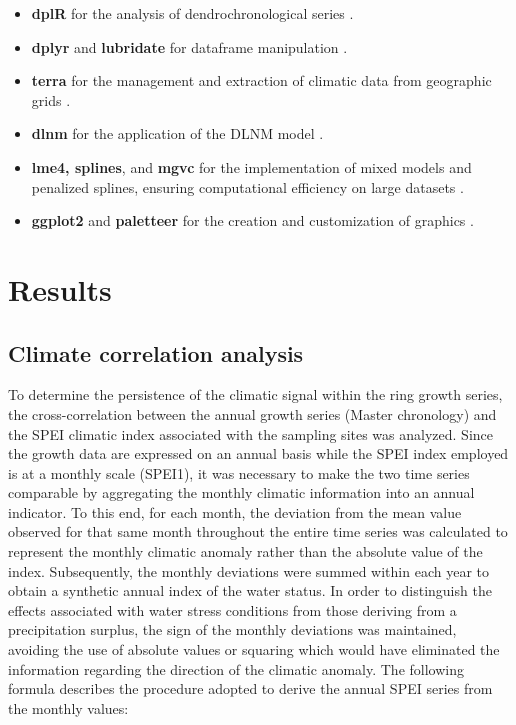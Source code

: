\documentclass[12pt, a4paper]{article}
\begin{document}
\begin{itemize}
    \item \textbf{dplR} for the analysis of dendrochronological series \parencite{bunn2025}.
    \item \textbf{dplyr} and \textbf{lubridate} for dataframe manipulation \parencite{wickham2026, grolemund2011}.
    \item \textbf{terra} for the management and extraction of climatic data from geographic grids \parencite{hijmans2026}.
    \item \textbf{dlnm} for the application of the DLNM model \parencite{gasparrini2011}.
    \item \textbf{lme4, splines}, and \textbf{mgvc} for the implementation of mixed models and penalized splines, ensuring computational efficiency on large datasets \parencite{bates2015, wang2021, wood2011}.
    \item \textbf{ggplot2} and \textbf{paletteer} for the creation and customization of graphics \parencite{wickham2016, hvitfeldt2021}.
\end{itemize}


\section{Results}

\subsection{Climate correlation analysis}

To determine the persistence of the climatic signal within the ring growth series, the cross-correlation between the annual growth series (Master chronology) and the SPEI climatic index associated with the sampling sites was analyzed. Since the growth data are expressed on an annual basis while the SPEI index employed is at a monthly scale (SPEI1), it was necessary to make the two time series comparable by aggregating the monthly climatic information into an annual indicator. To this end, for each month, the deviation from the mean value observed for that same month throughout the entire time series was calculated to represent the monthly climatic anomaly rather than the absolute value of the index. Subsequently, the monthly deviations were summed within each year to obtain a synthetic annual index of the water status. In order to distinguish the effects associated with water stress conditions from those deriving from a precipitation surplus, the sign of the monthly deviations was maintained, avoiding the use of absolute values or squaring which would have eliminated the information regarding the direction of the climatic anomaly. The following formula describes the procedure adopted to derive the annual SPEI series from the monthly values:
\end{document}
